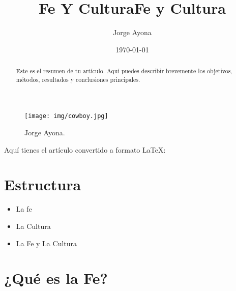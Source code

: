 \documentclass[a4paper,12pt,oneside]{article}
\title{Fe Y Cultura}
\author{Jorge Ayona}
\date{\today}
\begin{document}
\maketitle
\begin{figure}[h]
    \centering
   \texttt{[image: img/cowboy.jpg]}  %
    \caption{Jorge Ayona.}
    \label{fig:logo}
\end{figure}

\begin{abstract}
    Este es el resumen de tu artículo. Aquí puedes describir brevemente los objetivos, métodos, resultados y conclusiones principales.
\end{abstract}
\pagestyle{empty}
Aquí tienes el artículo convertido a formato LaTeX:



\title{Fe y Cultura}
\author{}
\date{}


\maketitle

\section*{Estructura}

\begin{itemize}
    \item La fe
    \item La Cultura
    \item La Fe y La Cultura
\end{itemize}

\section*{¿Qué es la Fe?}
\end{document}
